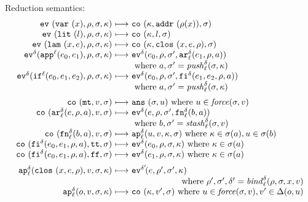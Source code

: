 \documentclass{llncs}
\begin{document}
Reduction semantics:
\begin{gather*}
\begin{array}{@{}r@{\ }c@{\ }l@{}}
\ev{\svar\mvar,\menv,\msto,\mkont} &\machstep&
\co{\mkont,\saddr{\menv(\mvar)},\msto}
\\
\ev{\slit\mlit,\menv,\msto,\mkont} &\machstep&
\co{\mkont,\mlit,\msto}
\\
\ev{\slam\mvar\mexp,\menv,\msto,\mkont} &\machstep&
\co{\mkont,\clos{\mvar,\mexp,\menv},\msto}
\\
\ev[^\mcntr]{\sapp[^\mlab]{\mexpi0}{\mexpi1},\menv,\msto,\mkont} &\machstep&
\ev[^\mcntr]{\mexpi{0},\menv,\msto',\kar[_\mlab^\mcntr]{\mexpi{1},\menv,\maddr}}
\\
&&
\text{ where }\maddr,\msto' = \push^\mcntr_\mlab(\msto,\mkont)
\\
\ev[^\mcntr]{\sif[^\mlab]{\mexpi0}{\mexpi1}{\mexpi2},\menv,\msto,\mkont} &\machstep&
\ev[^\mcntr]{\mexpi0,\menv,\msto',\kif[^\mcntr]{\mexpi1,\mexpi2,\menv,\maddr}}
\\
&&
\text{ where }\maddr,\msto' = \push_\mlab^\mcntr(\msto,\mkont)
\\[2mm]
\co{\kmt,\mval,\msto} &\machstep&
\ans{\msto,\mvalx{u}}
\text{ where } \mvalx{u} \in \force(\msto, \mval)
\\
\co{\kar[^\mcntr_\mlab]{\mexp,\menv,\maddr},\mval,\msto} & \machstep&
\ev[^\mcntr]{\mexp,\menv,\msto',\kfn[^\mcntr_\mlab]{\maddralt,\maddr}}
\\
&&
\text{ where }\maddralt,\msto' = \stash_\mlab^\mcntr(\msto,\mval)
\\
\co{\kfn[^\mcntr_\mlab]{\maddralt,\maddr},\mval,\msto} & \machstep&
\ap[^\mcntr_\mlab]{\mvalx{u},\mval,\mkont,\msto}
\text{ where } \mkont \in \msto(\maddr), \mvalx{u} \in \msto(\maddralt)
\\
\co{\kif[^\mcntr]{\mexpi0,\mexpi1,\menv,\maddr},\strue,\msto} & \machstep&
\ev[^\mcntr]{\mexpi0,\menv,\msto,\mkont}
\text{ where }\mkont\in\msto(\maddr)
\\
\co{\kif[^\mcntr]{\mexpi0,\mexpi1,\menv,\maddr},\sfalse,\msto} & \machstep&
\ev[^\mcntr]{\mexpi1,\menv,\msto,\mkont}
\text{ where }\mkont\in\msto(\maddr)
\\[2mm]
\ap[^\mcntr_\mlab]{\clos{\mvar,\mexp,\menv},\mval,\msto,\mkont} & \machstep&
\ev[^{\mcntr'}\!]{\mexp,\menv',\msto',\mkont}
\\
\multicolumn{3}{r@{}}{
\text{ where }\menv',\msto',\mcntr' = \bind^{ \mcntr}_\mlab(\menv,\msto,\mvar,\mval)}
\\
\ap[^\mcntr_\mlab]{\mop,\mval,\msto,\mkont} & \machstep&
\co{\mkont,\mval',\msto}
\text{ where } \mvalx{u} \in \force(\msto, \mval), \mval'\in\interpdelta(\mop,\mvalx{u})
\end{array}
\end{gather*}
\end{document}
